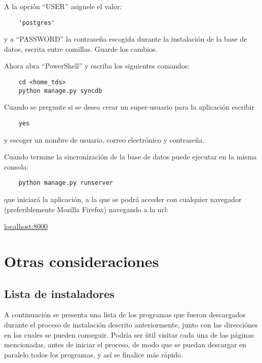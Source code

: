 \documentclass[9pt, letterpaper, oneside]{report}
\begin{document}
  A la opción ``USER'' asignele el valor:
  
  \begin{verbatim}
    'postgres'
  \end{verbatim}

  y a ``PASSWORD'' la contraseña escogida durante la instalación de la base de
  datos, escrita entre comillas. Guarde los cambios.

  Ahora abra ``PowerShell'' y escriba los siguientes comandos:

  \begin{verbatim}
    cd <home_tds>
    python manage.py syncdb
  \end{verbatim}
    
  Cuando se pregunte si se desea crear un super-usuario para la aplicación escribir

  \begin{verbatim}
    yes
  \end{verbatim}

  y escoger un nombre de usuario, correo electrónico y contraseña.

  Cuando termine la sincronización de la base de datos puede ejecutar en la misma
  consola:

  \begin{verbatim}
    python manage.py runserver
  \end{verbatim}

  que iniciará la aplicación, a la que se podrá acceder con cualquier navegador
  (preferiblemente Mozilla Firefox) navegando a la url:

  \vspace{3mm}
  \url{localhost:8000}
  \vspace{3mm}

\chapter{Otras consideraciones}
  \section{Lista de instaladores}
    A continuación se presenta una lista de los programas que fueron descargados
    durante el proceso de instalación descrito anteriormente, junto con las
    direcciónes en las cuales se pueden conseguir. Podría ser útil visitar cada una
    de las páginas mencionadas, antes de iniciar el proceso, de modo que se
    puedan descargar en paralelo todos los programas, y así se finalice más
    rápido.
\end{document}
